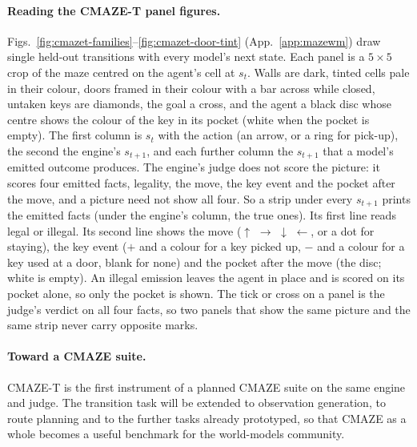 \documentclass{article} %
\begin{document}
\paragraph{Reading the CMAZE-T panel figures.} Figs.~\ref{fig:cmazet-families}--\ref{fig:cmazet-door-tint}
(App.~\ref{app:mazewm}) draw single held-out transitions with every model's next state. Each panel
is a $5\times5$ crop of the maze centred on the agent's cell at $s_t$. Walls are dark, tinted cells
pale in their colour, doors framed in their colour with a bar across while closed, untaken keys are
diamonds, the goal a cross, and the agent a black disc whose centre shows the colour of the key in its
pocket (white when the pocket is empty). The first column is $s_t$ with the action (an arrow, or a
ring for pick-up), the second the engine's $s_{t+1}$, and each further column the $s_{t+1}$ that a
model's emitted outcome produces. The engine's judge does not score the picture: it scores four
emitted facts, legality, the move, the key event and the pocket after the move, and a picture need
not show all four. So a strip under every $s_{t+1}$ prints the emitted facts (under the engine's
column, the true ones). Its first line reads legal or illegal. Its second line shows the move
($\uparrow$ $\rightarrow$ $\downarrow$ $\leftarrow$, or a dot for staying), the key event ($+$ and a
colour for a key picked up, $-$ and a colour for a key used at a door, blank for none) and the pocket
after the move (the disc; white is empty). An illegal emission leaves the agent in place and is scored
on its pocket alone, so only the pocket is shown. The tick or cross on a panel is the judge's verdict
on all four facts, so two panels that show the same picture and the same strip never carry opposite
marks.
\paragraph{Toward a CMAZE suite.} CMAZE-T is the first instrument of a planned CMAZE suite on the same
engine and judge. The transition task will be extended to observation generation, to route planning
and to the further tasks already prototyped, so that CMAZE as a whole becomes a useful benchmark for
the world-models community.

\end{document}

